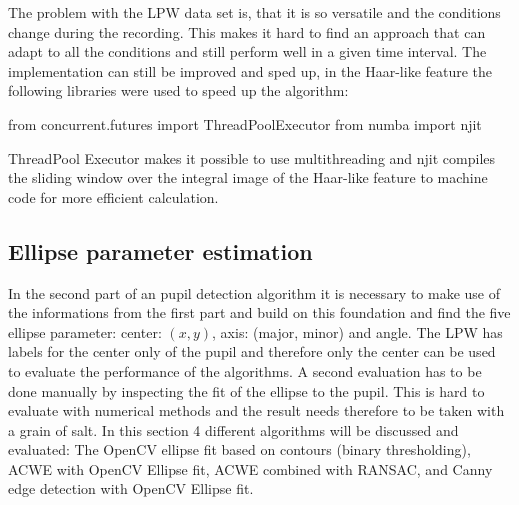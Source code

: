 The problem with the LPW data set is, that it is so versatile and the conditions change during the recording. This makes it hard to find an approach that can adapt to all the conditions and still perform well in a given time interval. The implementation can still be improved and sped up, in the Haar-like feature the following libraries were used to speed up the algorithm: 

\begin{python}
from concurrent.futures import ThreadPoolExecutor
from numba import njit
    \end{python}
ThreadPool Executor makes it possible to use multithreading and njit compiles the sliding window over the integral image of the Haar-like feature to machine code for more efficient calculation.

\subsection{Ellipse parameter estimation}
In the second part of an pupil detection algorithm it is necessary to make use of the informations from the first part and build on this foundation and find the five ellipse parameter: center: $(x,y)$, axis: (major, minor) and angle. The LPW has labels for the center only of the pupil and therefore only the center can be used to evaluate the performance of the algorithms. A second evaluation has to be done manually by inspecting the fit of the ellipse to the pupil. This is hard to evaluate with numerical methods and the result needs therefore to be taken with a grain of salt. In this section 4 different algorithms will be discussed and evaluated: The OpenCV ellipse fit based on contours (binary thresholding), ACWE with OpenCV Ellipse fit, ACWE combined with RANSAC, and Canny edge detection with OpenCV Ellipse fit. 

